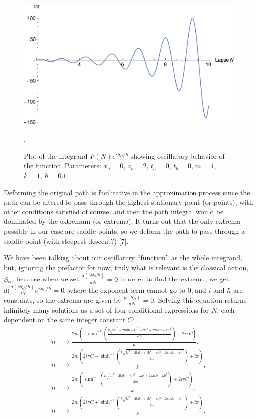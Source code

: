\documentclass[12pt]{revtex4}
\begin{document}
\begin{figure}[h]
	\centering
	\includegraphics[width=0.7\linewidth]{integrandplot}
	\caption{Plot of the integrand $F(N) e^{i S_{cl}/\hbar}$ showing oscillatory behavior of the function. Parameters: $x_a=0$, $x_b=2$, $t_a=0$, $t_b=0$, $m=1$, $k=1$, $\hbar=0.1$}.
	\label{fig:intplot}
\end{figure}
Deforming the original path is facilitative in the approximation process since the path can be altered to pass through the highest stationary point (or points), with other conditions satisfied of course, and then the path integral would be dominated by the extremum (or extrema). It turns out that the only extrema possible in our case are saddle points, so we deform the path to pass through a saddle point (with steepest descent?) [7].

We have been talking about our oscillatory ``function'' as the whole integrand, but, ignoring the prefactor for now, truly what is relevant is the classical action, $S_{cl}$, because when we set $\frac{d(e^{i S_{cl}/\hbar})}{dN}=0$ in order to find the extrema, we get $d(\frac{d(i S_{cl}/\hbar)}{dN} e^{i S_{cl}/\hbar}=0$, where the exponent term cannot go to 0, and $i$ and $\hbar$ are constants, so the extrema are given by $\frac{d(S_{cl})}{dN}=0$. Solving this equation returns infinitely many solutions as a set of four conditional expressions for $N$, each dependent on the same integer constant $C$:
\begin{align*}
n&\to \frac{2 m \left(-\sinh ^{-1}\left(\frac{k \sqrt{\text{ta}^2-2 \text{ta} \text{tb}+\text{tb}^2-\text{xa}^2+2 \text{xa} \text{xb}-\text{xb}^2}}{2 m}\right)+2 i \pi  C\right)}{k},\\
n&\to \frac{2 m \left(2 i \pi  C-\sinh ^{-1}\left(\frac{k \sqrt{\text{ta}^2-2 \text{ta} \text{tb}+\text{tb}^2-\text{xa}^2+2 \text{xa} \text{xb}-\text{xb}^2}}{2 m}\right)+i \pi \right)}{k},\\
n&\to \frac{2 m \left(\sinh ^{-1}\left(\frac{k \sqrt{\text{ta}^2-2 \text{ta} \text{tb}+\text{tb}^2-\text{xa}^2+2 \text{xa} \text{xb}-\text{xb}^2}}{2 m}\right)+2 i \pi  C\right)}{k},\\
n&\to \frac{2 m \left(2 i \pi  C+\sinh ^{-1}\left(\frac{k \sqrt{\text{ta}^2-2 \text{ta} \text{tb}+\text{tb}^2-\text{xa}^2+2 \text{xa} \text{xb}-\text{xb}^2}}{2 m}\right)+i \pi \right)}{k}.\\
\end{align*}
\end{document}
